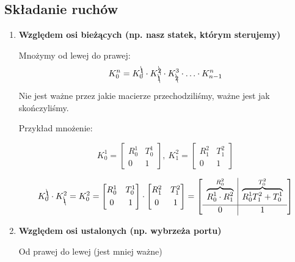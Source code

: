 \documentclass{article}
\begin{document}
\subsection{Składanie ruchów}

\begin{enumerate}
    \item {\bf Względem osi bieżących (np. nasz statek, którym sterujemy)}

          Mnożymy od lewej do prawej:
          \Large
          $$
              K_{0}^{n} = K_{0}^{\bcancel{1}}\cdot K_{\bcancel{1}}^{\bcancel{2}} \cdot K_{\bcancel{2}}^{3} \cdot \ldots \cdot K_{n-1}^{n}
          $$
          \normalsize

          Nie jest ważne przez jakie macierze przechodziliśmy, ważne jest jak skończyliśmy.


          Przykład mnożenie:

          \Large
          $$
              K_{0}^{1} =
              \begin{bmatrix}
                  R_{0}^{1} & T_{0}^{1} \\[0.3em]
                  0         & 1
              \end{bmatrix}
              , \
              K_{1}^{2} =
              \begin{bmatrix}
                  R_{1}^{2} & T_{1}^{2} \\[0.3em]
                  0         & 1
              \end{bmatrix}
          $$

          $$
              K_{0}^{\bcancel{1}}\cdot K_{\bcancel{1}}^{2} = K_{0}^{2} =
              \begin{bmatrix}
                  R_{0}^{1} & T_{0}^{1} \\[0.3em]
                  0         & 1
              \end{bmatrix}
              \cdot
              \begin{bmatrix}
                  R_{1}^{2} & T_{1}^{2} \\[0.3em]
                  0         & 1
              \end{bmatrix}
              =
              \begin{bmatrix}
                  \begin{array}{c|c}
                      \overbrace{R_{0}^{1}\cdot R_{1}^{2}}^{R_{0}^{2}} & \overbrace{R_{0}^{1}T_{1}^{2}+T_{0}^{1}}^{T_{0}^{2}} \\[0.3em]
                      \hline
                      0                                                & 1
                  \end{array}
              \end{bmatrix}
          $$
          \normalsize



    \item {\bf Względem osi ustalonych (np. wybrzeża portu)}

          Od prawej do lewej (jest mniej ważne)

\end{enumerate}
\normalsize
\end{document}
